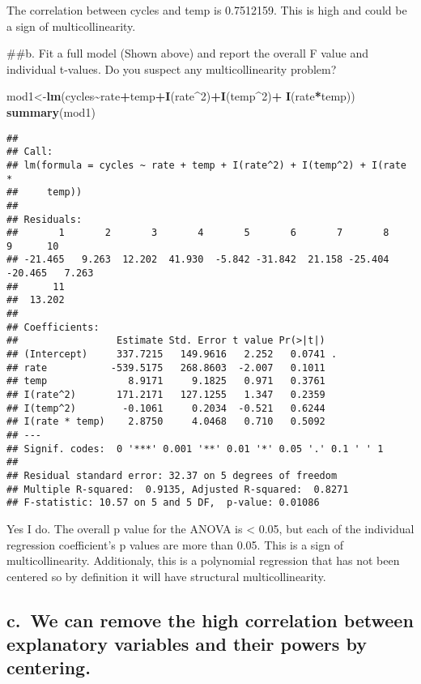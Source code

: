 \documentclass[
]{article}
\newenvironment{Shaded}{\begin{snugshade}}{\end{snugshade}}
\newcommand{\DecValTok}[1]{\textcolor[rgb]{0.00,0.00,0.81}{#1}}
\newcommand{\FunctionTok}[1]{\textcolor[rgb]{0.13,0.29,0.53}{\textbf{#1}}}
\newcommand{\NormalTok}[1]{#1}
\newcommand{\OtherTok}[1]{\textcolor[rgb]{0.56,0.35,0.01}{#1}}
\newcommand{\SpecialCharTok}[1]{\textcolor[rgb]{0.81,0.36,0.00}{\textbf{#1}}}
\begin{document}
The correlation between cycles and temp is 0.7512159. This is high and
could be a sign of multicollinearity.

\#\#b. Fit a full model (Shown above) and report the overall F value and
individual t-values. Do you suspect any multicollinearity problem?

\begin{Shaded}
\begin{Highlighting}[]
\NormalTok{mod1}\OtherTok{\textless{}{-}}\FunctionTok{lm}\NormalTok{(cycles}\SpecialCharTok{\textasciitilde{}}\NormalTok{rate}\SpecialCharTok{+}\NormalTok{temp}\SpecialCharTok{+}\FunctionTok{I}\NormalTok{(rate}\SpecialCharTok{\^{}}\DecValTok{2}\NormalTok{)}\SpecialCharTok{+}\FunctionTok{I}\NormalTok{(temp}\SpecialCharTok{\^{}}\DecValTok{2}\NormalTok{)}\SpecialCharTok{+} \FunctionTok{I}\NormalTok{(rate}\SpecialCharTok{*}\NormalTok{temp))}
\FunctionTok{summary}\NormalTok{(mod1)}
\end{Highlighting}
\end{Shaded}

\begin{verbatim}
## 
## Call:
## lm(formula = cycles ~ rate + temp + I(rate^2) + I(temp^2) + I(rate * 
##     temp))
## 
## Residuals:
##       1       2       3       4       5       6       7       8       9      10 
## -21.465   9.263  12.202  41.930  -5.842 -31.842  21.158 -25.404 -20.465   7.263 
##      11 
##  13.202 
## 
## Coefficients:
##                 Estimate Std. Error t value Pr(>|t|)  
## (Intercept)     337.7215   149.9616   2.252   0.0741 .
## rate           -539.5175   268.8603  -2.007   0.1011  
## temp              8.9171     9.1825   0.971   0.3761  
## I(rate^2)       171.2171   127.1255   1.347   0.2359  
## I(temp^2)        -0.1061     0.2034  -0.521   0.6244  
## I(rate * temp)    2.8750     4.0468   0.710   0.5092  
## ---
## Signif. codes:  0 '***' 0.001 '**' 0.01 '*' 0.05 '.' 0.1 ' ' 1
## 
## Residual standard error: 32.37 on 5 degrees of freedom
## Multiple R-squared:  0.9135, Adjusted R-squared:  0.8271 
## F-statistic: 10.57 on 5 and 5 DF,  p-value: 0.01086
\end{verbatim}

Yes I do. The overall p value for the ANOVA is \textless{} 0.05, but
each of the individual regression coefficient's p values are more than
0.05. This is a sign of multicollinearity. Additionaly, this is a
polynomial regression that has not been centered so by definition it
will have structural multicollinearity.

\hypertarget{c.-we-can-remove-the-high-correlation-between-explanatory-variables-and-their-powers-by-centering.}{%
\subsection{c.~We can remove the high correlation between explanatory
variables and their powers by
centering.}\label{c.-we-can-remove-the-high-correlation-between-explanatory-variables-and-their-powers-by-centering.}}
\end{document}
